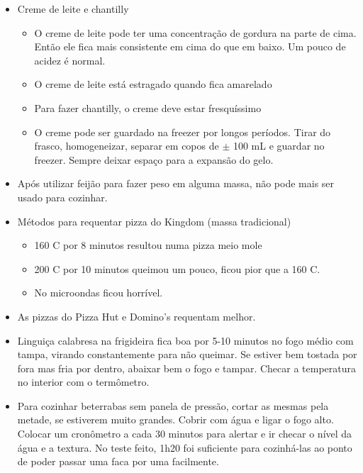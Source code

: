 \begin{itemize}
	\item Creme de leite e chantilly
	      \begin{itemize}
		      \item O creme de leite pode ter uma concentração de gordura na parte de cima.
		            Então ele fica mais consistente em cima do que em baixo. Um pouco de acidez
		            é normal.
		      \item O creme de leite está estragado quando fica amarelado
		      \item Para fazer chantilly, o creme deve estar fresquíssimo
		      \item O creme pode ser guardado na freezer por longos períodos. Tirar do
		            frasco, homogeneizar, separar em copos de $\pm$ 100 mL e guardar no freezer.
		            Sempre deixar espaço para a expansão do gelo.
	      \end{itemize}

	\item Após utilizar feijão para fazer peso em alguma massa, não pode mais ser
	      usado para cozinhar.
  \item Métodos para requentar pizza do Kingdom (massa tradicional)
    \begin{itemize}
    \item 160 \grau C por 8 minutos resultou numa pizza meio mole
    \item 200 \grau C por 10 minutos queimou um pouco, ficou pior que a 160
      \grau C.
    \item No microondas ficou horrível.
    \end{itemize}
  \item As pizzas do Pizza Hut e Domino's requentam melhor.
  \item Linguiça calabresa na frigideira fica boa por 5-10 minutos no fogo médio
    com tampa, virando constantemente para não queimar. Se estiver bem tostada
    por fora mas fria por dentro, abaixar bem o fogo e tampar. Checar a
    temperatura no interior com o termômetro.
  \item Para cozinhar beterrabas sem panela de pressão, cortar as mesmas pela
    metade, se estiverem muito grandes. Cobrir com água e ligar o fogo alto.
    Colocar um cronômetro a cada 30 minutos para alertar e ir checar o nível da
    água e a textura. No teste feito, 1h20 foi suficiente para cozinhá-las ao
    ponto de poder passar uma faca por uma facilmente.
\end{itemize}


